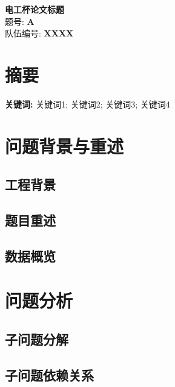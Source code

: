 \documentclass[12pt,a4paper]{ctexart}
\begin{document}
\begin{titlepage}
\begin{center}
\vspace*{2cm}
{\Huge \textbf{电工杯论文标题}}\\[2cm]
{\Large 题号: \textbf{A}}\\[1cm]
{\Large 队伍编号: \textbf{XXXX}}\\[3cm]
\end{center}
\end{titlepage}

\section*{摘要}


\textbf{关键词:} 关键词1; 关键词2; 关键词3; 关键词4

\newpage
\tableofcontents
\newpage


\section{问题背景与重述}

\subsection{工程背景}

\subsection{题目重述}

\subsection{数据概览}

\section{问题分析}

\subsection{子问题分解}

\subsection{子问题依赖关系}
\end{document}
